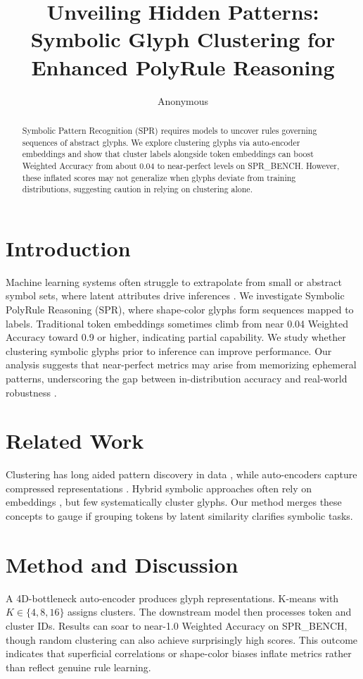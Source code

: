 \documentclass{article} %
\title{Unveiling Hidden Patterns: Symbolic Glyph Clustering for Enhanced PolyRule Reasoning}
\author{Anonymous}
\theoremstyle{plain}
\theoremstyle{definition}
\theoremstyle{remark}
\begin{document}
\maketitle

\begin{abstract}
Symbolic Pattern Recognition (SPR) requires models to uncover rules governing sequences of abstract glyphs. We explore clustering glyphs via auto-encoder embeddings and show that cluster labels alongside token embeddings can boost Weighted Accuracy from about 0.04 to near-perfect levels on SPR\_BENCH. However, these inflated scores may not generalize when glyphs deviate from training distributions, suggesting caution in relying on clustering alone.
\end{abstract}

\section{Introduction}
Machine learning systems often struggle to extrapolate from small or abstract symbol sets, where latent attributes drive inferences \citep{goodfellow2016deep, devlin2019bertpo, mondorf2024beyondae}. We investigate Symbolic PolyRule Reasoning (SPR), where shape-color glyphs form sequences mapped to labels. Traditional token embeddings sometimes climb from near 0.04 Weighted Accuracy toward 0.9 or higher, indicating partial capability. We study whether clustering symbolic glyphs prior to inference can improve performance. Our analysis suggests that near-perfect metrics may arise from memorizing ephemeral patterns, underscoring the gap between in-distribution accuracy and real-world robustness \citep{alotaibi2024graphol, yu2024reasonagainue}.

\section{Related Work}
Clustering has long aided pattern discovery in data \citep{hartigan1979akc, sreedhar2017clusteringld, deng2020dbscanca}, while auto-encoders capture compressed representations \citep{lee2023interactivegs}. Hybrid symbolic approaches often rely on embeddings \citep{snell2017prototypicalnf}, but few systematically cluster glyphs. Our method merges these concepts to gauge if grouping tokens by latent similarity clarifies symbolic tasks.

\section{Method and Discussion}
A 4D-bottleneck auto-encoder produces glyph representations. K-means with $K\in\{4,8,16\}$ assigns clusters. The downstream model then processes token and cluster IDs. Results can soar to near-1.0 Weighted Accuracy on SPR\_BENCH, though random clustering can also achieve surprisingly high scores. This outcome indicates that superficial correlations or shape-color biases inflate metrics rather than reflect genuine rule learning.
\end{document}
